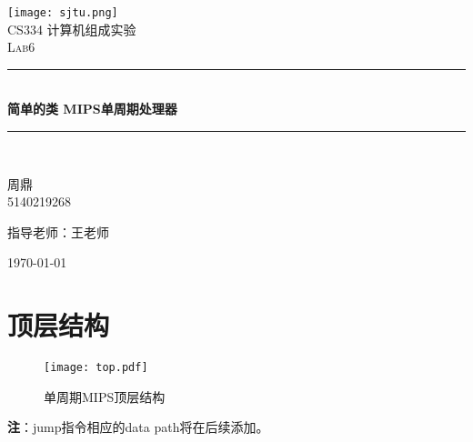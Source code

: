 \documentclass[a4paper]{article}
\newcommand{\HRule}{\rule{\linewidth}{0.5mm}}
\begin{document}
\begin{titlepage}
    \begin{center} %
    \texttt{[image: sjtu.png]}\\[1cm]
    \textsc{\LARGE CS334 计算机组成实验}\\[1.5cm]
    \textsc{\Large Lab6}\\[0.5cm] %
    \HRule \\[0.4cm] { \huge \bfseries 简单的类 MIPS单周期处理器}\\[0.4cm]
    \HRule \\[1.5cm] %
    \begin{minipage}{0.4\textwidth}
        \begin{flushleft}
        \large
        周鼎\\
        5140219268
        \end{flushleft}
        \end{minipage}
        \begin{minipage}{0.4\textwidth}
        \begin{flushright}
        \large
        指导老师：王老师
        \end{flushright}
        \end{minipage}
        \vfill %
        {\large \today}
    \end{center}
\end{titlepage}


\section{顶层结构}
            \begin{figure}[htbp]
                \centering
                    \texttt{[image: top.pdf]}
                \caption{单周期MIPS顶层结构}\label{TOP}
            \end{figure}
            \begin{center}
              \textbf{注}：jump指令相应的data path将在后续添加。
            \end{center}
\end{document}
